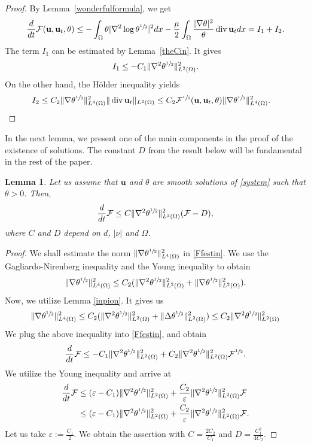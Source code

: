 \documentclass[11pt]{article}
\numberwithin{equation}{section}
\theoremstyle{plain}
\newtheorem{lem}[defi]{Lemma}
\newcommand\bb[1]{\mathbf{#1}}
\newcommand{\io}{\int_{\Omega}}
\newcommand{\ld}{L^2(\Omega)}
\newcommand{\sul}{\sfrac{1}{2}}
\newcommand{\ddt}{\frac{d}{dt}}
\renewcommand{\div}{\operatorname{div}}
\newcommand{\F}{\mathcal{F}}
\let \epsilon\varepsilon
\newcommand{\bu}{\bb{u}}
\begin{document}
\begin{proof}
By Lemma~\ref{wonderfulformula}, we get
\begin{align*}%
\ddt \F(\bb u,\bu_t, \theta) \leq-\io\theta|\nabla^2\log\theta^{\sul}|^2dx-\frac\mu2\io\frac{|\nabla\theta|^2}\theta\div \bb{u}_tdx =I_1 + I_2.
\end{align*}
The term $I_1$ can be estimated by Lemma~\ref{theCin}. It gives
\begin{align*}%
I_1\leq -C_1\|\nabla^2\theta^{\sul}\|_{\ld}^2.
\end{align*}
On the other hand, the Hölder inequality yields
\begin{align*}
I_2&\leq   C_2\|\nabla\theta^{\sul}\|_{L^4(\Omega)}^2\|\div \bb{u}_t\|_{\ld}\leq    C_2 \F^{\sul}(\bb u,\bu_t, \theta) \|\nabla\theta^{\sul}\|_{L^4(\Omega)}^2.		
\end{align*}
\end{proof}

In the next lemma, we present one of the main components in the proof of the existence of solutions. The constant $D$ from the result below will be fundamental in the rest of the paper. 
\begin{lem}
Let us assume that $\bu$ and $\theta$ are smooth solutions of \eqref{system} such that $\theta>0$. Then,
\begin{align*}
\ddt\F\leq C\|\nabla^2\theta^{\sul}\|_{\ld}^2(\F-D),
\end{align*}
where $C$ and $D$ depend on $d$, $|\nu|$ and $\Omega$.
\end{lem}
\begin{proof}
We shall estimate the norm $\|\nabla\theta^{\sul}\|_{L^4(\Omega)}^2$ in \eqref{Ffestin}. We use the Gagliardo-Nirenberg inequality and the Young inequality to obtain
\begin{align*}
\|\nabla\theta^{\sul}\|^2_{L^4(\Omega)}\leq C_2(\|\nabla^2\theta^{\sul}\|_{\ld}^2+\|\nabla\theta^{\sul}\|_{\ld}^2).
\end{align*}
Now, we utilize Lemma \ref{inpion}. It gives us
\begin{align*}
\|\nabla\theta^{\sul}\|^2_{L^4(\Omega)}\leq C_2(\|\nabla^2\theta^{\sul}\|_{\ld}^2+\|\Delta\theta^{\sul}\|_{\ld}^2)\leq C_2 \|\nabla^2\theta^{\sul}\|_{\ld}^2
\end{align*}
We plug the above inequality into \eqref{Ffestin}, and obtain
\begin{align*}
\ddt\F\leq -C_1\|\nabla^2\theta^{\sul}\|_{\ld}^2+C_2\|\nabla^2\theta^{\sul}\|_{\ld}^2\F^{\sul}.
\end{align*}
We utilize the Young inequality and arrive at
\begin{align*}
\ddt\F&\leq (\epsilon-C_1)\|\nabla^2\theta^{\sul}\|_{\ld}^2+\frac{C_2}{\epsilon}\|\nabla^2\theta^{\sul}\|_{\ld}^2\F\\
&\leq (\epsilon-C_1)\|\nabla^2\theta^{\sul}\|_{\ld}^2+\frac{C_2}{\epsilon}\|\nabla^2\theta^{\sul}\|_{\ld}^2\F.
\end{align*}
Let us take $\epsilon:=\frac{C_1}2$. We obtain the assertion with $C=\frac{2C_2}{C_1}$ and $D=\frac{C_1^2}{4C_2}$.
\end{proof}
\end{document}
